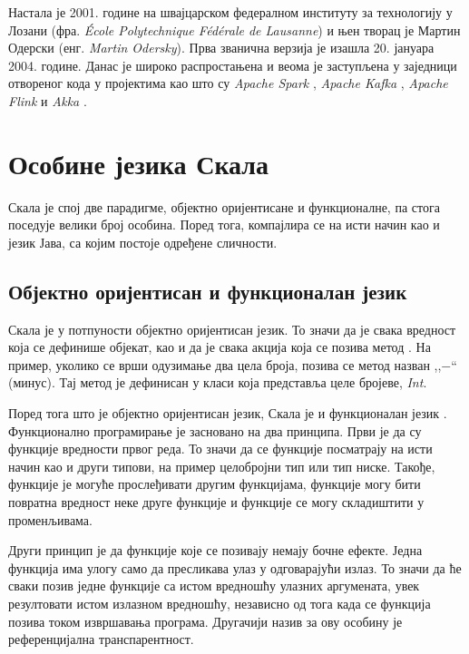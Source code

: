 \documentclass[12pt,oneside]{memoir}
\begin{document}
Настала је 2001. године на швајцарском федералном институту за технологију у Лозани (фра. \textit{École Polytechnique Fédérale de Lausanne}) и њен творац је Мартин Одерски (енг. \textit{Martin Odersky}). Прва званична верзија је изашла 20. јануара 2004. године. Данас је широко распростањена и веома је заступљена у заједници отвореног кода у пројектима као што су \textit{Apache Spark} \cite{apache_spark}, \textit{Apache Kafka} \cite{apache_kafka}, \textit{Apache Flink} \cite{apache_flink} и \textit{Akka} \cite{scala_akka}.

\section{Особине језика Скала}
\label{sec:osоб_scala}


Скала је спој две парадигме, објектно оријентисане и функционалне, па стога поседује велики број особина. Поред тога, компајлира се на исти начин као и језик Јава, са којим постоје одређене сличности.

\subsection{Објектно оријентисан и функционалан језик}
\label{subsec:scala_obj_prog}

Скала је у потпуности објектно оријентисан језик. То значи да је свака вредност која се дефинише објекат, као и да је свака акција која се позива метод \cite{scala_prog}. На пример, уколико се врши одузимање два цела броја, позива се метод назван ,,$-$`` (минус). Тај метод је дефинисан у класи која представља целе бројеве, \textit{Int}. 

Поред тога што је објектно оријентисан језик, Скала је и функционалан језик \cite{scala_prog}. Функционално програмирање је засновано на два принципа. Први је да су функције вредности првог реда. То значи да се функције посматрају на исти начин као и други типови, на пример целобројни тип или тип ниске. Такође, функције је могуће прослеђивати другим функцијама, функције могу бити повратна вредност неке друге функције и функције се могу складиштити у променљивама.

Други принцип је да функције које се позивају немају бочне ефекте. Једна функција има улогу само да пресликава улаз у одговарајући излаз. То значи да ће сваки позив једне функције са истом вредношћу улазних аргумената, увек резултовати истом излазном вредношћу, независно од тога када се функција позива током извршавања програма. Другачији назив за ову особину је референцијална транспарентност.
\end{document}
